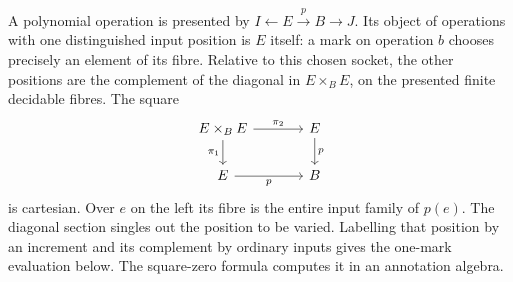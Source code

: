 \documentclass[11pt,a4paper]{article}
\theoremstyle{definition}
\theoremstyle{remark}\newaliascnt{remark}{theorem}
\numberwithin{equation}{section}
\begin{document}
A polynomial operation is presented by \(I\leftarrow E\xrightarrow{p}B\to J\). Its object of operations with one distinguished input position is \(E\) itself: a mark on operation \(b\) chooses precisely an element of its fibre. Relative to this chosen socket, the other positions are the complement of the diagonal in \(E\times_B E\), on the presented finite decidable fibres. The square
\[
\begin{tikzcd}[column sep=large]
 E\times_B E\arrow[r,"\pi_2"]\arrow[d,"\pi_1"']&E\arrow[d,"p"]\\
 E\arrow[r,"p"']&B
\end{tikzcd}
\]
is cartesian. Over \(e\) on the left its fibre is the entire input family of \(p(e)\). The diagonal section singles out the position to be varied. Labelling that position by an increment and its complement by ordinary inputs gives the one-mark evaluation below. The square-zero formula computes it in an annotation algebra.
\end{document}
